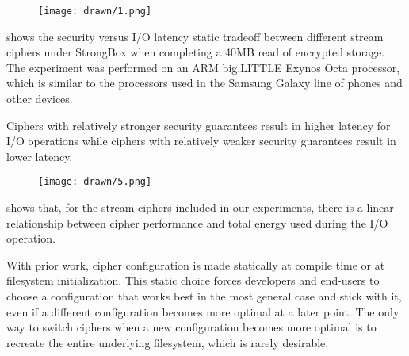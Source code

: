 \begin{figure}[ht]
 \centering
  \texttt{[image: drawn/1.png]}
   \caption{}\label{fig:40mb-read}
\end{figure}

 shows the security versus I/O latency static
tradeoff between different stream ciphers under StrongBox when completing a 40MB
read of encrypted storage. The experiment was performed on an ARM big.LITTLE
Exynos Octa processor, which is similar to the processors used in the Samsung
Galaxy line of phones and other devices. 

Ciphers with relatively stronger security guarantees result in higher latency
for I/O operations while ciphers with relatively weaker security guarantees
result in lower latency.

\begin{figure}[ht]
 \centering
  \texttt{[image: drawn/5.png]}
   \caption{}\label{fig:energy-latency-linearity}
\end{figure}

 shows that, for the stream ciphers included in
our experiments, there is a linear relationship between cipher performance and
total energy used during the I/O operation.

With prior work,  cipher configuration is made
statically at compile time or at filesystem initialization. This static choice
forces developers and end-users to choose a configuration that works best in the
most general case and stick with it, even if a different configuration becomes
more optimal at a later point. The only way to switch ciphers when a new
configuration becomes more optimal is to recreate the entire underlying
filesystem, which is rarely desirable.  

